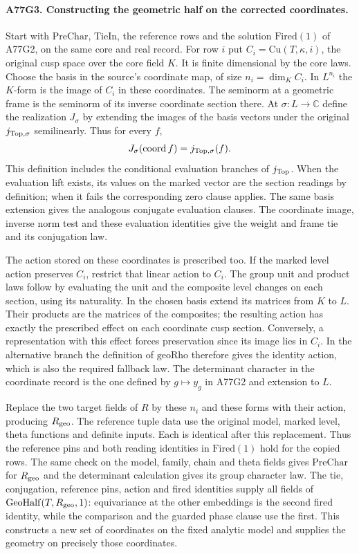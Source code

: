 \paragraph{A77G3. Constructing the geometric half on the corrected coordinates.}
Start with $\mathrm{PreChar}$, $\mathrm{TieIn}$, the reference
rows and the solution $\mathrm{Fired}(1)$ of A77G2, on the same
core and real record. For row $i$ put $C_i=\mathrm{Cu}(T,\kappa,i)$,
the original cusp space over the core field $K$. It is finite
dimensional by the core laws. Choose the basis in the source's
coordinate map, of size $n_i=\dim_K C_i$. In $L^{n_i}$ the
$K$-form is the image of $C_i$ in these coordinates. The seminorm
at a geometric frame is the seminorm of its inverse coordinate
section there. At $\sigma:L\to\mathbb C$ define the realization
$J_\sigma$ by extending the images of the basis vectors under
the original $j_{\rm Top,\sigma}$ semilinearly. Thus for every $f$,
\[
     J_\sigma(\operatorname{coord} f)=j_{\rm Top,\sigma}(f).
\]
This definition includes the conditional evaluation branches
of $j_{\rm Top}$. When the evaluation lift exists, its values
on the marked vector are the section readings by definition;
when it fails the corresponding zero clause applies. The same
basis extension gives the analogous conjugate evaluation clauses.
The coordinate image, inverse norm test and these evaluation
identities give the weight and frame tie and its conjugation law.

The action stored on these coordinates is prescribed too.
If the marked level action preserves $C_i$, restrict that linear
action to $C_i$. The group unit and product laws follow by
evaluating the unit and the composite level changes on each
section, using its naturality. In the chosen basis extend its
matrices from $K$ to $L$. Their products are the matrices of the
composites; the resulting action has exactly the prescribed effect
on each coordinate cusp section. Conversely, a representation
with this effect forces preservation since its image lies in
$C_i$. In the alternative branch the definition of
$\mathrm{geoRho}$ therefore gives the identity action, which is
also the required fallback law. The determinant character in the
coordinate record is the one defined by $g\mapsto y_g$ in A77G2
and extension to $L$.

Replace the two target fields of $R$ by these $n_i$ and these
forms with their action, producing $R_{\rm geo}$.
The reference tuple data use the original model, marked level,
theta functions and definite inputs. Each is identical after this
replacement. Thus the reference pins and both reading identities
in $\mathrm{Fired}(1)$ hold for the copied rows. The same check on
the model, family, chain and theta fields gives $\mathrm{PreChar}$
for $R_{\rm geo}$ and the determinant calculation gives its
group character law. The tie, conjugation, reference pins, action
and fired identities supply all fields of
$\mathrm{GeoHalf}(T,R_{\rm geo},1)$: equivariance at the other
embeddings is the second fired identity, while the comparison
and the guarded phase clause use the first. This constructs a
new set of coordinates on the fixed analytic model and supplies
the geometry on precisely those coordinates.
